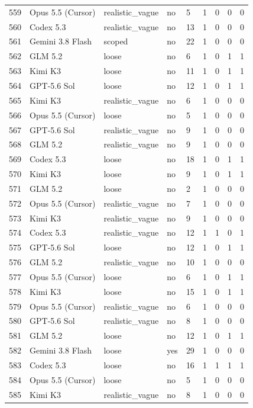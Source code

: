 \begin{tabular}{lllllllll}
559 & Opus 5.5 (Cursor) & realistic\_vague & no & 5 & 1 & 0 & 0 & 0 \\
560 & Codex 5.3 & realistic\_vague & no & 13 & 1 & 0 & 0 & 0 \\
561 & Gemini 3.8 Flash & scoped & no & 22 & 1 & 0 & 0 & 0 \\
562 & GLM 5.2 & loose & no & 6 & 1 & 0 & 1 & 1 \\
563 & Kimi K3 & loose & no & 11 & 1 & 0 & 1 & 1 \\
564 & GPT-5.6 Sol & loose & no & 12 & 1 & 0 & 1 & 1 \\
565 & Kimi K3 & realistic\_vague & no & 6 & 1 & 0 & 0 & 0 \\
566 & Opus 5.5 (Cursor) & loose & no & 5 & 1 & 0 & 0 & 0 \\
567 & GPT-5.6 Sol & realistic\_vague & no & 9 & 1 & 0 & 0 & 0 \\
568 & GLM 5.2 & realistic\_vague & no & 9 & 1 & 0 & 0 & 0 \\
569 & Codex 5.3 & loose & no & 18 & 1 & 0 & 1 & 1 \\
570 & Kimi K3 & loose & no & 9 & 1 & 0 & 1 & 1 \\
571 & GLM 5.2 & loose & no & 2 & 1 & 0 & 0 & 0 \\
572 & Opus 5.5 (Cursor) & realistic\_vague & no & 7 & 1 & 0 & 0 & 0 \\
573 & Kimi K3 & realistic\_vague & no & 9 & 1 & 0 & 0 & 0 \\
574 & Codex 5.3 & realistic\_vague & no & 12 & 1 & 1 & 0 & 1 \\
575 & GPT-5.6 Sol & loose & no & 12 & 1 & 0 & 1 & 1 \\
576 & GLM 5.2 & realistic\_vague & no & 10 & 1 & 0 & 0 & 0 \\
577 & Opus 5.5 (Cursor) & loose & no & 6 & 1 & 0 & 1 & 1 \\
578 & Kimi K3 & loose & no & 15 & 1 & 0 & 1 & 1 \\
579 & Opus 5.5 (Cursor) & realistic\_vague & no & 6 & 1 & 0 & 0 & 0 \\
580 & GPT-5.6 Sol & realistic\_vague & no & 8 & 1 & 0 & 0 & 0 \\
581 & GLM 5.2 & loose & no & 12 & 1 & 0 & 1 & 1 \\
582 & Gemini 3.8 Flash & loose & yes & 29 & 1 & 0 & 0 & 0 \\
583 & Codex 5.3 & loose & no & 16 & 1 & 1 & 1 & 1 \\
584 & Opus 5.5 (Cursor) & loose & no & 5 & 1 & 0 & 0 & 0 \\
585 & Kimi K3 & realistic\_vague & no & 8 & 1 & 0 & 0 & 0 \\

\end{tabular}

